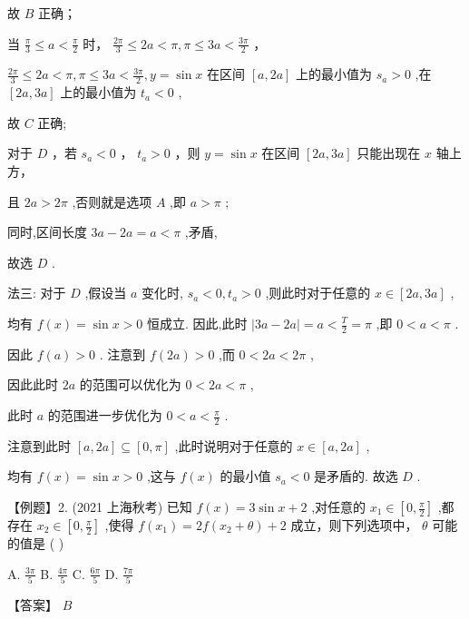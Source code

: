 \documentclass[10pt]{article}
\newcommand*\circled[1]{\tikz[baseline=(char.base)]{\node[shape=circle,draw,inner sep=1.5pt] (char) {\small #1};}}
\begin{document}
故 \(B\) 正确；

 \circled{3}  当 \(\frac{\pi }{3} \leq  a < \frac{\pi }{2}\) 时， \(\frac{2\pi }{3} \leq  {2a} < \pi ,\pi  \leq  {3a} < \frac{3\pi }{2}\) ，

\(\frac{2\pi }{3} \leq  {2a} < \pi ,\pi  \leq  {3a} < \frac{3\pi }{2},y = \sin x\) 在区间 \(\left\lbrack  {a,{2a}}\right\rbrack\) 上的最小值为 \({s}_{a} > 0\) ,在 \(\left\lbrack  {{2a},{3a}}\right\rbrack\) 上的最小值为 \({t}_{a} < 0\) ,

故 \(C\) 正确;

 \circled{4} 对于 \(D\) ，若 \({s}_{a} < 0\) ， \({t}_{a} > 0\) ，则 \(y = \sin x\) 在区间 \(\left\lbrack  {{2a},{3a}}\right\rbrack\) 只能出现在 \(x\) 轴上方，

且 \({2a} > {2\pi }\) ,否则就是选项 \(A\) ,即 \(a > \pi\) ;

同时,区间长度 \({3a} - {2a} = a < \pi\) ,矛盾,

故选 \(D\) .

法三: 对于 \(D\) ,假设当 \(a\) 变化时, \({s}_{a} < 0,{t}_{a} > 0\) ,则此时对于任意的 \(x \in  \left\lbrack  {{2a},{3a}}\right\rbrack\) ,

均有 \(f\left( x\right)  = \sin x > 0\) 恒成立. 因此,此时 \(\left| {{3a} - {2a}}\right|  = a < \frac{T}{2} = \pi\) ,即 \(0 < a < \pi\) .

因此 \(f\left( a\right)  > 0\) . 注意到 \(f\left( {2a}\right)  > 0\) ,而 \(0 < {2a} < {2\pi }\) ,

因此此时 \({2a}\) 的范围可以优化为 \(0 < {2a} < \pi\) ,

此时 \(a\) 的范围进一步优化为 \(0 < a < \frac{\pi }{2}\) .

注意到此时 \(\left\lbrack  {a,{2a}}\right\rbrack   \subseteq  \left\lbrack  {0,\pi }\right\rbrack\) ,此时说明对于任意的 \(x \in  \left\lbrack  {a,{2a}}\right\rbrack\) ,

均有 \(f\left( x\right)  = \sin x > 0\) ,这与 \(f\left( x\right)\) 的最小值 \({s}_{a} < 0\) 是矛盾的. 故选 \(D\) .

【例题】2. (2021 上海秋考) 已知 \(f\left( x\right)  = 3\sin x + 2\) ,对任意的 \({x}_{1} \in  \left\lbrack  {0,\frac{\pi }{2}}\right\rbrack\) ,都存在 \({x}_{2} \in  \left\lbrack  {0,\frac{\pi }{2}}\right\rbrack\) ,使得 \(f\left( {x}_{1}\right)  = {2f}\left( {{x}_{2} + \theta }\right)  + 2\) 成立，则下列选项中， \(\theta\) 可能的值是 ( )

A. \(\frac{3\pi }{5}\) B. \(\frac{4\pi }{5}\) C. \(\frac{6\pi }{5}\) D. \(\frac{7\pi }{5}\)

【答案】 \(B\)
\end{document}
